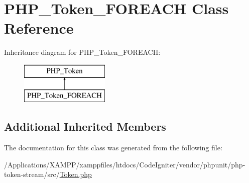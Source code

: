 \hypertarget{class_p_h_p___token___f_o_r_e_a_c_h}{}\section{P\+H\+P\+\_\+\+Token\+\_\+\+F\+O\+R\+E\+A\+CH Class Reference}
\label{class_p_h_p___token___f_o_r_e_a_c_h}
Inheritance diagram for P\+H\+P\+\_\+\+Token\+\_\+\+F\+O\+R\+E\+A\+CH\+:\begin{figure}[H]
\begin{center}
\leavevmode
\includegraphics[height=2.000000cm]{class_p_h_p___token___f_o_r_e_a_c_h}
\end{center}
\end{figure}
\subsection*{Additional Inherited Members}


The documentation for this class was generated from the following file\+:\begin{DoxyCompactItemize}
\item 
/\+Applications/\+X\+A\+M\+P\+P/xamppfiles/htdocs/\+Code\+Igniter/vendor/phpunit/php-\/token-\/stream/src/\mbox{\hyperlink{_token_8php}{Token.\+php}}\end{DoxyCompactItemize}
